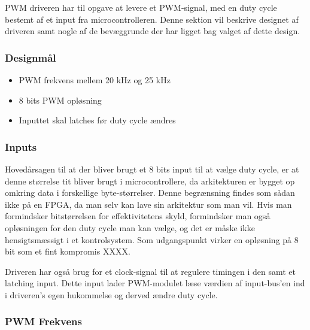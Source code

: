 PWM driveren har til opgave at levere et PWM-signal, med en duty cycle bestemt af et input fra microcontrolleren. Denne sektion vil beskrive designet af driveren samt nogle af de bevæggrunde der har ligget bag valget af dette design.

\subsubsection{Designmål}

\begin{itemize}

\item PWM frekvens mellem 20 kHz og 25 kHz
\item 8 bits PWM opløsning
\item Inputtet skal latches før duty cycle ændres

\end{itemize}

\subsubsection{Inputs}

Hovedårsagen til at der bliver brugt et 8 bits input til at vælge duty cycle, er at denne størrelse tit bliver brugt i microcontrollere, da arkitekturen er bygget op omkring data i forskellige byte-størrelser. Denne begrænsning findes som sådan ikke på en FPGA, da man selv kan lave sin arkitektur som man vil. Hvis man formindsker bitstørrelsen for effektivitetens skyld, formindsker man også opløsningen for den duty cycle man kan vælge, og det er måske ikke hensigtsmæssigt i et kontrolsystem. Som udgangspunkt virker en opløsning på 8 bit som et fint kompromis XXXX.

Driveren har også brug for et clock-signal til at regulere timingen i den samt et latching input. Dette input lader PWM-modulet læse værdien af input-bus'en ind i driveren's egen hukommelse og derved ændre duty cycle.

\subsubsection{PWM Frekvens}

